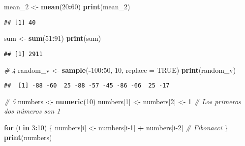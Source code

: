 \documentclass[
]{article}
\newenvironment{Shaded}{\begin{snugshade}}{\end{snugshade}}
\newcommand{\AttributeTok}[1]{\textcolor[rgb]{0.13,0.29,0.53}{#1}}
\newcommand{\CommentTok}[1]{\textcolor[rgb]{0.56,0.35,0.01}{\textit{#1}}}
\newcommand{\ConstantTok}[1]{\textcolor[rgb]{0.56,0.35,0.01}{#1}}
\newcommand{\ControlFlowTok}[1]{\textcolor[rgb]{0.13,0.29,0.53}{\textbf{#1}}}
\newcommand{\DecValTok}[1]{\textcolor[rgb]{0.00,0.00,0.81}{#1}}
\newcommand{\FunctionTok}[1]{\textcolor[rgb]{0.13,0.29,0.53}{\textbf{#1}}}
\newcommand{\NormalTok}[1]{#1}
\newcommand{\OtherTok}[1]{\textcolor[rgb]{0.56,0.35,0.01}{#1}}
\newcommand{\SpecialCharTok}[1]{\textcolor[rgb]{0.81,0.36,0.00}{\textbf{#1}}}
\begin{document}
\begin{Shaded}
\begin{Highlighting}[]
\NormalTok{mean\_2 }\OtherTok{\textless{}{-}} \FunctionTok{mean}\NormalTok{(}\DecValTok{20}\SpecialCharTok{:}\DecValTok{60}\NormalTok{)}
\FunctionTok{print}\NormalTok{(mean\_2)}
\end{Highlighting}
\end{Shaded}

\begin{verbatim}
## [1] 40
\end{verbatim}

\begin{Shaded}
\begin{Highlighting}[]
\NormalTok{sum }\OtherTok{\textless{}{-}} \FunctionTok{sum}\NormalTok{(}\DecValTok{51}\SpecialCharTok{:}\DecValTok{91}\NormalTok{)}
\FunctionTok{print}\NormalTok{(sum)}
\end{Highlighting}
\end{Shaded}

\begin{verbatim}
## [1] 2911
\end{verbatim}

\begin{Shaded}
\begin{Highlighting}[]
\CommentTok{\# 4}
\NormalTok{random\_v }\OtherTok{\textless{}{-}} \FunctionTok{sample}\NormalTok{(}\SpecialCharTok{{-}}\DecValTok{100}\SpecialCharTok{:}\DecValTok{50}\NormalTok{, }\DecValTok{10}\NormalTok{, }\AttributeTok{replace =} \ConstantTok{TRUE}\NormalTok{)}
\FunctionTok{print}\NormalTok{(random\_v)}
\end{Highlighting}
\end{Shaded}

\begin{verbatim}
##  [1] -88 -60  25 -88 -57 -45 -86 -66  25 -17
\end{verbatim}

\begin{Shaded}
\begin{Highlighting}[]
\CommentTok{\# 5}
\NormalTok{numbers }\OtherTok{\textless{}{-}} \FunctionTok{numeric}\NormalTok{(}\DecValTok{10}\NormalTok{)}
\NormalTok{numbers[}\DecValTok{1}\NormalTok{] }\OtherTok{\textless{}{-}}\NormalTok{ numbers[}\DecValTok{2}\NormalTok{] }\OtherTok{\textless{}{-}} \DecValTok{1}  \CommentTok{\# Los primeros dos números son 1}

\ControlFlowTok{for}\NormalTok{ (i }\ControlFlowTok{in} \DecValTok{3}\SpecialCharTok{:}\DecValTok{10}\NormalTok{) \{}
\NormalTok{  numbers[i] }\OtherTok{\textless{}{-}}\NormalTok{ numbers[i}\DecValTok{{-}1}\NormalTok{] }\SpecialCharTok{+}\NormalTok{ numbers[i}\DecValTok{{-}2}\NormalTok{]  }\CommentTok{\# Fibonacci}
\NormalTok{\}}
\FunctionTok{print}\NormalTok{(numbers)}
\end{Highlighting}
\end{Shaded}
\end{document}
